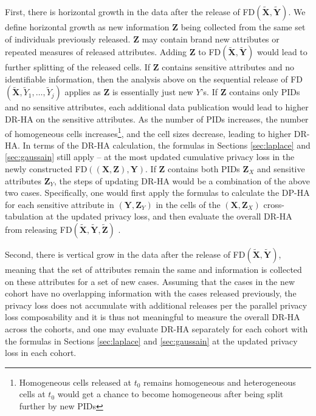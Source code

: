 \documentclass[10pt,journal,compsoc]{IEEEtran}
\newcommand{\X}{\mathbf{X}}
\newcommand{\Y}{\mathbf{Y}}
\newcommand{\Z}{\mathbf{Z}}
\begin{document}
First, there is horizontal growth in the data after the release of FD$(\tilde{\X},\tilde{\Y})$. We define horizontal growth as new information $\Z$ being collected from the same set of individuals previously released. $\Z$ may contain brand new attributes or repeated measures of released attributes. Adding $\Z$ to FD$(\tilde{\X},\tilde{\Y})$ would lead to further splitting of the released cells. If $\Z$ contains sensitive attributes and no identifiable information, then the analysis above on the sequential release of FD$(\tilde{\X},\tilde{Y}_1,\ldots,\tilde{Y}_j)$ applies as $\Z$ is essentially just new $Y$'s. If $\Z$  contains only PIDs and no sensitive attributes, each additional data publication would lead to higher DR-HA on the sensitive attributes.  As the number of PIDs increases,  the number of homogeneous cells increases\footnote{Homogeneous cells released at $t_0$ remains homogeneous and heterogeneous cells at $t_0$ would get a chance to become homogeneous after being split further by new PIDs}, and the cell sizes decrease, leading to higher DR-HA. In terms of the DR-HA calculation, the  formulas in Sections \ref{sec:laplace} and \ref{sec:gaussain} still apply -- at the most updated cumulative privacy loss in the newly constructed FD$((\X,\Z),\Y)$. 
If $\Z$ contains both PIDs $\Z_X$ and  sensitive attributes $\Z_Y$, the steps of updating DR-HA would be a combination of the above two cases. Specifically, one would first apply the formulas  to calculate the DP-HA for each sensitive attribute in $(\Y,\Z_Y)$ in the cells of the $(\X,\Z_X)$  cross-tabulation at the updated privacy loss, and then evaluate the overall DR-HA from releasing FD$(\tilde{\X},\tilde{\Y},\tilde{\Z})$ .

Second, there is vertical grow in the data after the release of FD$(\tilde{\X},\tilde{\Y})$, meaning that the set of attributes remain the same and information is collected on these attributes for a set of new cases. Assuming that the cases in the new cohort have no overlapping information with the cases released previously, the privacy loss does not accumulate with additional releases per the parallel privacy loss composability and it is thus not meaningful to measure the overall DR-HA across the cohorts,  and one may evaluate DR-HA separately for each cohort with the formulas in Sections \ref{sec:laplace} and \ref{sec:gaussain} at the updated privacy loss in each cohort. 
\end{document}
